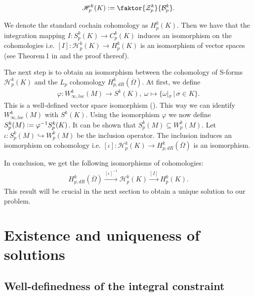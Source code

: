 \documentclass[12pt,a4paper]{article}
\theoremstyle{definition}
\newcommand{\lpcoho}{H^k_{p,dR}}
\newcommand{\omegabar}{\overline{\Omega}}
\begin{document}
\begin{align*}
    \mathscr{H}_p^k(K) \vcentcolon= 
    \faktor{\mathcal{Z}_p^k}{\mathcal{B}_p^k}.
\end{align*}

We denote the standard cochain cohomology as $H^k_p(K)$. Then we have that the 
integration mapping
$I: S_p^k(K) \rightarrow C_p^k(K)$ 
induces an isomorphism on the cohomologies i.e. 
$[I]: \mathscr{H}_p^k(K) \rightarrow H^k_p(K)$ is an isomorphism of vector 
spaces (see Theorem\,1 in \cite{goldshtein}
and the proof thereof).







The next step is to obtain an isomorphism between the cohomology 
of S-forms $\mathscr{H}_p^k(K)$ and the $L_p$ cohomology 
$\lpcoho(\omegabar)$. At first, we define 
\begin{align*}
\varphi: W^k_{\infty,loc}(M) \rightarrow S^k(K), \;
\omega \mapsto \{ \omega|_\sigma \, |\, \sigma \in K \}.
\end{align*}
This is a well-defined vector space isomorphism (\cite[p.191]{goldshtein}). This
way we can identify $W^k_{\infty,loc}(M)$ with $S^k(K)$.  Using the
isomorphism $\varphi$ we now define 
$S^k_p(M) \vcentcolon= \varphi^{-1} S^k_p(K)$.
It can be shown that $S^k_p(M) \subseteq W^k_p(M)$. Let 
$\iota: S^k_p(M) \hookrightarrow W^k_p(M)$ be the inclusion operator. 
The inclusion induces an
isomorphism on cohomology \cite[Lemma 4, Corollary]{goldshtein} i.e. 
$[\iota]: \mathscr{H}_p^k(K) \rightarrow \lpcoho(\omegabar)$ is an isomorphism. 


In conclusion, we get the following isomorphisms of cohomologies:
\begin{align*}
    \lpcoho(\omegabar) \xrightarrow{[\iota]^{-1}} \mathscr{H}_p^k(K) 
    \xrightarrow{[I]} H^k_p(K).
\end{align*}
This result will be crucial in the next section to obtain a unique solution
to our problem.






\section{Existence and uniqueness of solutions}
\subsection{Well-definedness of the integral constraint} 
\label{well_definedness_integral}
\end{document}
